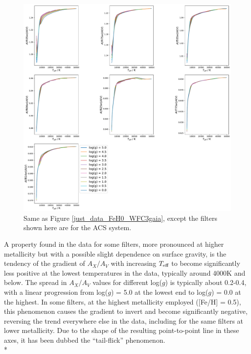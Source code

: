 \documentclass[12pt, a4paper]{report}
\begin{document}
\begin{figure}[h]
\begin{center}
\includegraphics[width=1.0\textwidth]{../just_full_data/ACS/AHub_FeH0p0_just_Teff_plot_lines.pdf}
\caption{Same as Figure \ref{just_data_FeH0_WFC3gaia}, except the filters shown here are for the ACS system.}
\label{just_data_FeH0_ACS}
\end{center}
\end{figure}

A property found in the data for some filters, more pronounced at higher metallicity but with a possible slight dependence on surface gravity, is the tendency of the gradient of $A_{X}/A_{V}$ with increasing $T_{\textnormal{eff}}$ to become significantly less positive at the lowest temperatures in the data, typically around 4000K and below. The spread in $A_{X}/A_{V}$ values for different log($g$) is typically about 0.2-0.4, with a linear progression from log($g$) = 5.0 at the lowest end to log($g$) = 0.0 at the highest. In some filters, at the highest metallicity employed ([Fe/H] = 0.5), this phenomenon causes the gradient to invert and become significantly negative, reversing the trend everywhere else in the data, including for the same filters at lower metallicity. Due to the shape of the resulting point-to-point line in these axes, it has been dubbed the ``tail-flick'' phenomenon.\\*
\end{document}
